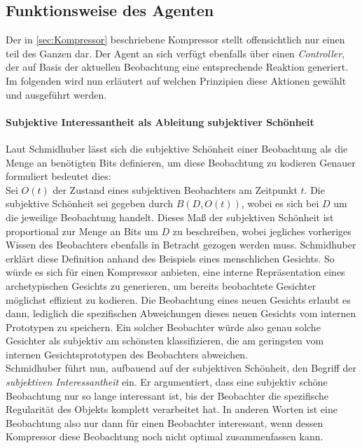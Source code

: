 \subsection{Funktionsweise des Agenten}
Der in \ref{sec:Kompressor} beschriebene Kompressor stellt offensichtlich nur einen teil des Ganzen dar. Der Agent an sich verfügt ebenfalls über einen \emph{Controller}, der auf Basis der aktuellen Beobachtung eine entsprechende Reaktion generiert.
Im folgenden wird nun erläutert auf welchen Prinzipien diese Aktionen gewählt und ausgeführt werden.

\paragraph{Subjektive Interessantheit als Ableitung subjektiver Schönheit}
\label{sec:Beauty_und_Curiosity}
Laut Schmidhuber lässt sich die subjektive Schönheit einer Beobachtung als die Menge an benötigten Bits definieren, um diese Beobachtung zu kodieren \cite[p.~7]{curiosity_schmidhuber} 
Genauer formuliert bedeutet dies: \\
Sei \(O(t)\) der Zustand eines subjektiven Beobachters am Zeitpunkt \(t\). 
Die subjektive Schönheit sei gegeben durch \(B(D,O(t))\), wobei es sich bei \(D\) um die jeweilige Beobachtung handelt.
Dieses Maß der subjektiven Schönheit ist proportional zur Menge an Bits um \(D\) zu beschreiben, wobei jegliches vorheriges Wissen des Beobachters ebenfalls in Betracht gezogen werden muss. \cite[p.~7]{curiosity_schmidhuber}
Schmidhuber erklärt diese Definition anhand des Beispiels eines menschlichen Gesichts. So würde es sich für einen Kompressor anbieten, eine interne Repräsentation eines archetypischen Gesichts zu generieren, um bereits beobachtete Gesichter möglichst effizient zu kodieren. Die Beobachtung eines neuen Gesichts erlaubt es dann, lediglich die spezifischen Abweichungen dieses neuen Gesichts vom internen Prototypen zu speichern. Ein solcher Beobachter würde also genau solche Gesichter als subjektiv am schönsten klassifizieren, die am geringsten vom internen Gesichtsprototypen des Beobachters abweichen. \cite[p.~7]{curiosity_schmidhuber} \\

Schmidhuber führt nun, aufbauend auf der subjektiven Schönheit, den Begriff der \emph{subjektiven Interessantheit} ein. 
Er argumentiert, dass eine subjektiv schöne Beobachtung nur so lange interessant ist, bis der Beobachter die spezifische Regularität des Objekts komplett verarbeitet hat.\cite[p.~7-8]{curiosity_schmidhuber} In anderen Worten ist eine Beobachtung also nur dann für einen Beobachter interessant, wenn dessen Kompressor diese Beobachtung noch nicht optimal zusammenfassen kann. \\

